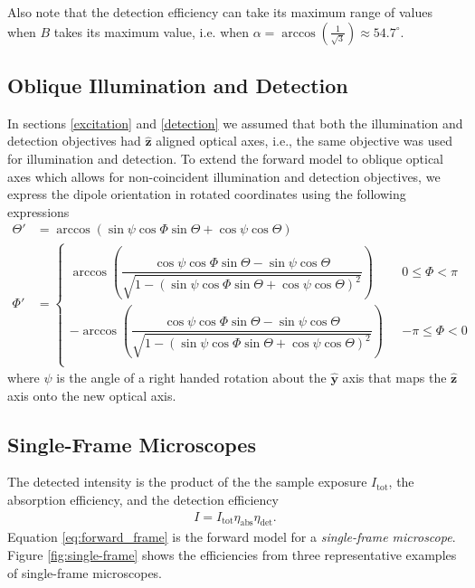 \documentclass[10pt]{article}
\providecommand{\mh}[1]{\mathbf{\hat{#1}}}
\begin{document}
Also note that the detection efficiency can take its maximum range of values
when $B$ takes its maximum value, i.e. when
$\alpha=\arccos\left(\frac{1}{\sqrt{3}}\right) \approx 54.7^{\circ}$. 

\subsection{Oblique Illumination and Detection}\label{oblique}
In sections \ref{excitation} and \ref{detection} we assumed that both the
illumination and detection objectives had $\mh{z}$ aligned optical axes, i.e.,
the same objective was used for illumination and detection. To extend the
forward model to oblique optical axes which allows for non-coincident
illumination and detection objectives, we express the dipole orientation in
rotated coordinates using the following expressions
\begin{align}
    \Theta' &= \arccos\left(\sin\psi\cos\Phi\sin\Theta + \cos\psi\cos\Theta\right)\label{eq:thetap}\\
  \Phi' &=
          \begin{cases}
            \arccos\left(\dfrac{\cos\psi\cos\Phi\sin\Theta - \sin\psi\cos\Theta}{\sqrt{1 - (\sin\psi\cos\Phi\sin\Theta + \cos\psi\cos\Theta)^2}}\right) \ \ \ &0 \leq \Phi < \pi  \\
            -\arccos\left(\dfrac{\cos\psi\cos\Phi\sin\Theta - \sin\psi\cos\Theta}{\sqrt{1 - (\sin\psi\cos\Phi\sin\Theta + \cos\psi\cos\Theta)^2}}\right) \ \ \ &-\pi \leq \Phi < 0\\
          \end{cases}
\end{align}
where $\psi$ is the angle of a right handed rotation about the $\mh{y}$ axis
that maps the $\mh{z}$ axis onto the new optical axis.

\subsection{Single-Frame Microscopes}\label{forward}
The detected intensity is the product of the the sample exposure
$I_{\text{tot}}$, the absorption efficiency, and the detection efficiency
\begin{align}
  I = I_{\text{tot}}\eta_{\text{abs}}\eta_{\text{det}}\label{eq:forward_frame}.
\end{align}
Equation \ref{eq:forward_frame} is the forward model for a \emph{single-frame
  microscope}. Figure \ref{fig:single-frame} shows the efficiencies from three
representative examples of single-frame microscopes.
\end{document}
